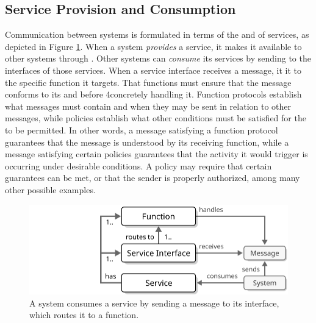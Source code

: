 \subsection{Service Provision and Consumption}

Communication between systems is formulated in terms of the  and  of services, as depicted in Figure \ref{fig:service-consumption}.
When a system \textit{provides} a service, it makes it available to other systems through .
Other systems can \textit{consume} its services by sending  to the interfaces of those services.
When a service interface receives a message, it  it to the specific function it targets.
That functions must ensure that the message conforms to its  and  before 4concretely handling it.
Function protocols establish what messages must contain and when they may be sent in relation to other messages, while policies establish what other conditions must be satisfied for the  to be permitted.
In other words, a message satisfying a function protocol guarantees that the message is understood by its receiving function, while a message satisfying certain policies guarantees that the activity it would trigger is occurring under desirable conditions.
A policy may require that certain  guarantees can be met, or that the sender is properly authorized, among many other possible examples.

\begin{figure}[ht!]
  \centering
  \includegraphics[scale=0.9]{figures/service-consumption}
  \caption{
    A system consumes a service by sending a message to its interface, which routes it to a function.
  }
  \label{fig:service-consumption}
\end{figure}

